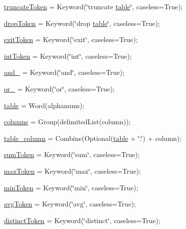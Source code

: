 \begin{DoxyCompactItemize}
\item 
\hyperlink{namespaceparse__query_ae8bbedcc418797a022f1729c3ab06d8f}{truncate\+Token} = Keyword(\char`\"{}truncate \hyperlink{namespaceparse__query_a45fab7a8c6d7ac5d8cf43f37b4d29b7e}{table}\char`\"{}, caseless=True);
\item 
\hyperlink{namespaceparse__query_a5b967e0942a66c2cd672cffd95199882}{drop\+Token} = Keyword(\char`\"{}drop \hyperlink{namespaceparse__query_a45fab7a8c6d7ac5d8cf43f37b4d29b7e}{table}\char`\"{}, caseless=True);
\item 
\hyperlink{namespaceparse__query_a5f6923b6db3ab18f01b7c58ba767cd0d}{exit\+Token} = Keyword(\char`\"{}exit\char`\"{}, caseless=True);
\item 
\hyperlink{namespaceparse__query_ad3fcd102f8a00826a83a1e8a921760d0}{int\+Token} = Keyword(\char`\"{}int\char`\"{}, caseless=True);
\item 
\hyperlink{namespaceparse__query_aeeaf26f2706237e92e28ef37167e0d24}{and\+\_\+} = Keyword(\char`\"{}and\char`\"{}, caseless=True);
\item 
\hyperlink{namespaceparse__query_a8d9f764c774421bbc4bc8b8e40f32668}{or\+\_\+} = Keyword(\char`\"{}or\char`\"{}, caseless=True);
\item 
\hyperlink{namespaceparse__query_a45fab7a8c6d7ac5d8cf43f37b4d29b7e}{table} = Word(alphanums);
\item 
\hyperlink{namespaceparse__query_aba0ec1a15dd6eeaf692596690d6256ed}{columns} = Group(delimited\+List(column));
\item 
\hyperlink{namespaceparse__query_a834dee534400bd080a0a16f06a77be78}{table\+\_\+column} = Combine(Optional(\hyperlink{namespaceparse__query_a45fab7a8c6d7ac5d8cf43f37b4d29b7e}{table} + \char`\"{}.\char`\"{}) + column);
\item 
\hyperlink{namespaceparse__query_a8d38f4998f3935568112fcd8e31e06a3}{sum\+Token} = Keyword(\char`\"{}sum\char`\"{}, caseless=True);
\item 
\hyperlink{namespaceparse__query_a1189a8897d300e08d3d4b00224482d79}{max\+Token} = Keyword(\char`\"{}max\char`\"{}, caseless=True);
\item 
\hyperlink{namespaceparse__query_a70846ee64743086995f9e5a5cf892eca}{min\+Token} = Keyword(\char`\"{}min\char`\"{}, caseless=True);
\item 
\hyperlink{namespaceparse__query_ac13d5a3fbab8872f67fb655514b59e1b}{avg\+Token} = Keyword(\char`\"{}avg\char`\"{}, caseless=True);
\item 
\hyperlink{namespaceparse__query_a12a40f814458cd318eb56742bc0a84ab}{distinct\+Token} = Keyword(\char`\"{}distinct\char`\"{}, caseless=True);

\end{DoxyCompactItemize}
